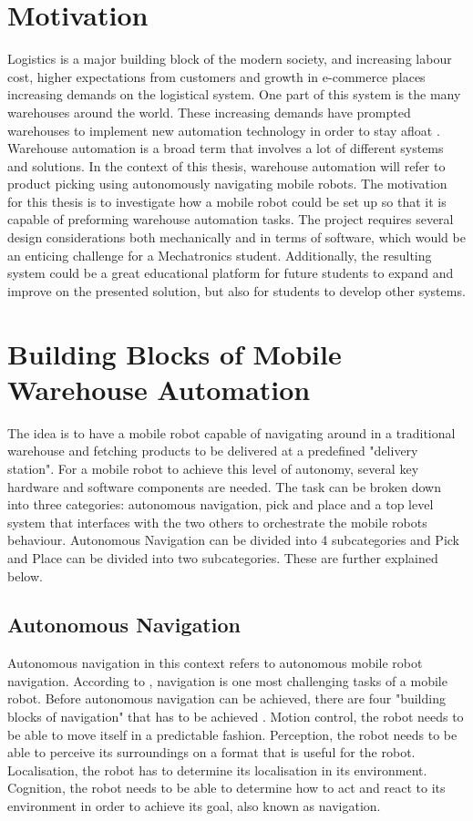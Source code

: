 \section{Motivation}
Logistics is a major building block of the modern society, and increasing labour cost, higher expectations from customers and growth in e-commerce places increasing demands on the logistical system. One part of this system is the many warehouses around the world. These increasing demands have prompted warehouses to implement new automation technology in order to stay afloat \cite{CaiKai2020Wabl}. Warehouse automation is a broad term that involves a lot of different systems and solutions. In the context of this thesis, warehouse automation will refer to product picking using autonomously navigating mobile robots. The motivation for this thesis is to investigate how a mobile robot could be set up so that it is capable of preforming warehouse automation tasks. The project requires several design considerations both mechanically and in terms of software, which would be an enticing challenge for a Mechatronics student. Additionally, the resulting system could be a great educational platform for future students to expand and improve on the presented solution, but also for students to develop other systems.

\section{Building Blocks of Mobile Warehouse Automation}
The idea is to have a mobile robot capable of navigating around in a traditional warehouse and fetching products to be delivered at a predefined "delivery station". For a mobile robot to achieve this level of autonomy, several key hardware and software components are needed. The task can be broken down into three categories: autonomous navigation, pick and place and a top level system that interfaces with the two others to orchestrate the mobile robots behaviour. Autonomous Navigation can be divided into 4 subcategories and Pick and Place can be divided into two subcategories. These are further explained below.

\subsection{Autonomous Navigation}\label{sec:I:AutonomousNavigation}
Autonomous navigation in this context refers to autonomous mobile robot navigation. According to \cite{SiegwartRoland2011Itam}, navigation is one most challenging tasks of a mobile robot. Before autonomous navigation can be achieved, there are four "building blocks of navigation" that has to be achieved \cite{SiegwartRoland2011Itam}.  Motion control, the robot needs to be able to move itself in a predictable fashion. Perception, the robot needs to be able to perceive its surroundings on a format that is useful for the robot. Localisation, the robot has to determine its localisation in its environment. Cognition, the robot needs to be able to determine how to act and react to its environment in order to achieve its goal, also known as navigation.

